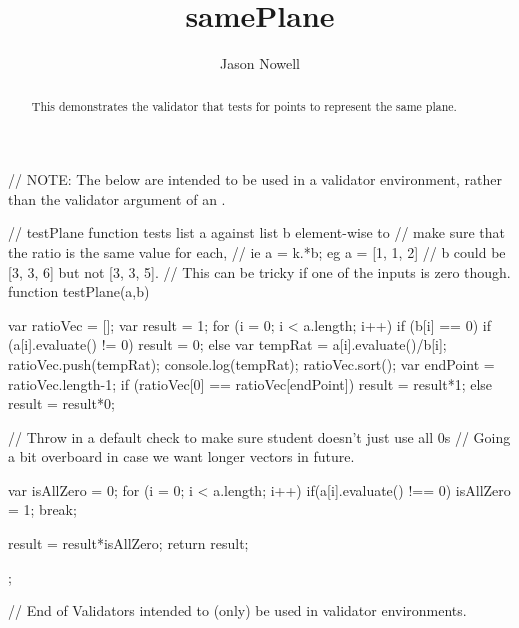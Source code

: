 \documentclass{ximera}
\title{samePlane}
\author{Jason Nowell}
\begin{document}
\begin{abstract}
    This demonstrates the validator that tests for points to represent the same plane.
\end{abstract}
\maketitle

\begin{javascript}
// NOTE: The below are intended to be used in a validator environment, rather than the validator argument of an \answer.

// testPlane function tests list a against list b element-wise to 
// make sure that the ratio is the same value for each, 
// ie a = k.*b; eg a = [1, 1, 2] 
// b could be [3, 3, 6] but not [3, 3, 5]. 
// This can be tricky if one of the inputs is zero though.
function testPlane(a,b) {
	var ratioVec = [];
	var result = 1;
	for (i = 0; i < a.length; i++) {
		if (b[i] == 0) {
			if (a[i].evaluate() != 0){
				result = 0;
			}
		}
		else {
			var tempRat = a[i].evaluate()/b[i];
			ratioVec.push(tempRat);
			console.log(tempRat);
		}
	}
	ratioVec.sort();
	var endPoint = ratioVec.length-1;
	if (ratioVec[0] == ratioVec[endPoint]) {
		result = result*1;
	}
	else {
		result = result*0;
	}
    
    // Throw in a default check to make sure student doesn't just use all 0s
    // Going a bit overboard in case we want longer vectors in future.
    
    var isAllZero = 0;
    for (i = 0; i < a.length; i++) {
      if(a[i].evaluate() !== 0) {
        isAllZero = 1;
        break;
      }
    }
    
    result = result*isAllZero;
	return result;
};


// End of Validators intended to (only) be used in validator environments.

\end{javascript}

\end{document}
